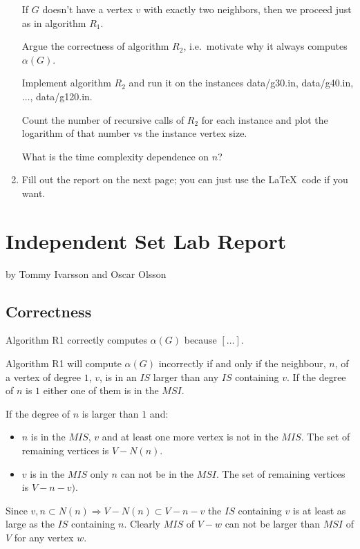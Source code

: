 \documentclass{tufte-handout}
\begin{document}
\begin{enumerate}
  If $G$ doesn't have a vertex $v$ with exactly two neighbors, then we
  proceed just as in algorithm $R_1$.
 
 Argue the correctness of algorithm $R_2$, i.e.\ motivate why it always computes $\alpha(G)$.
 
 Implement algorithm $R_2$ and run it on the instances
  data/g30.in, data/g40.in, $\ldots$, data/g120.in.

  Count the number of recursive calls of $R_2$ for each instance and plot the
  logarithm of that number vs the instance vertex size. 
  
  What is the time complexity dependence on $n$?

\item Fill out the report on the next page; you can just use the
  \LaTeX\ code if you want.
\end{enumerate}

\newpage


\newpage
\section{Independent Set Lab Report}


by Tommy Ivarsson and Oscar Olsson

\subsection{Correctness}
Algorithm R1 correctly computes $\alpha(G)$ because $[\ldots]$.

Algorithm R1 will compute $\alpha(G)$ incorrectly if and only if the neighbour,
$n$, of a vertex of degree $1$, $v$, is in an $IS$ larger than any $IS$ containing $v$.
If the degree of $n$ is $1$ either one of them is in the $MSI$.

If the degree of $n$ is larger than $1$ and:
\begin{itemize}
	\item $n$ is in the $MIS$, $v$ and at least one more vertex is not in the
		$MIS$. The set of remaining vertices is $V - N(n)$.
	\item $v$ is in the $MIS$ only $n$ can not be in the $MSI$. The set of
		remaining vertices is $V - n - v)$.
\end{itemize}

Since ${v,n} \subset N(n) \Rightarrow V - N(n) \subset V - n - v$ the $IS$
containing $v$ is at least as large as the $IS$ containing $n$. Clearly $MIS$
of $V - w$ can not be larger than $MSI$ of $V$ for any vertex $w$.
\end{document}
